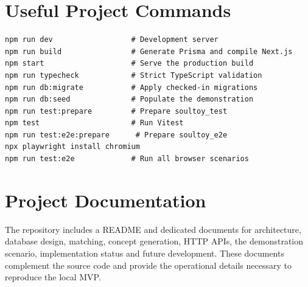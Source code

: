 \documentclass[11pt,a4paper]{article}
\begin{document}
\appendix
\section{Useful Project Commands}
\begin{lstlisting}
npm run dev                  # Development server
npm run build                # Generate Prisma and compile Next.js
npm start                    # Serve the production build
npm run typecheck            # Strict TypeScript validation
npm run db:migrate           # Apply checked-in migrations
npm run db:seed              # Populate the demonstration
npm run test:prepare         # Prepare soultoy_test
npm test                     # Run Vitest
npm run test:e2e:prepare      # Prepare soultoy_e2e
npx playwright install chromium
npm run test:e2e             # Run all browser scenarios
\end{lstlisting}

\section{Project Documentation}
The repository includes a README and dedicated documents for architecture, database design, matching, concept generation, HTTP APIs, the demonstration scenario, implementation status and future development. These documents complement the source code and provide the operational details necessary to reproduce the local MVP.
\end{document}
